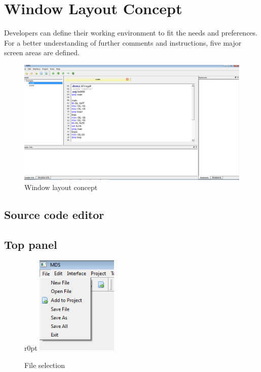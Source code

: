 \section{Window Layout Concept}
    Developers can define their working environment to fit the needs and preferences. For a better understanding of further comments and instructions, five major screen areas are defined. %
    \begin{figure}[h]
        \centering
        \includegraphics [width=.9\textwidth]{img/Demonstration_project.png}
        \caption{Window layout concept}
    \end{figure}

\subsection{Source code editor}

\subsection{Top panel}
    \begin{figure}{r}{0pt}
        \centering
        \includegraphics[width=110pt]{img/menu_file.png}
        \caption{File selection}
    \end{figure}

